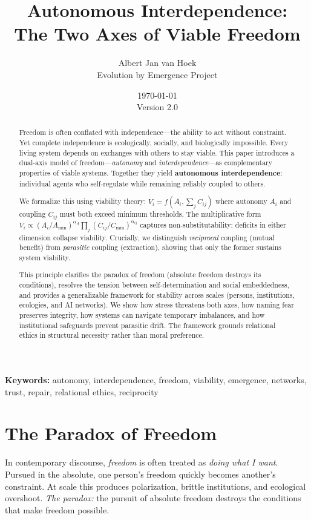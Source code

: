 \documentclass[11pt,a4paper]{article}
\title{\textbf{Autonomous Interdependence:\\The Two Axes of Viable Freedom}}
\author{Albert Jan van Hoek \\ \small Evolution by Emergence Project}
\date{\today \\ \small Version 2.0}
\begin{document}
\maketitle

\begin{abstract}
Freedom is often conflated with independence---the ability to act without constraint.
Yet complete independence is ecologically, socially, and biologically impossible.
Every living system depends on exchanges with others to stay viable.
This paper introduces a dual-axis model of freedom---\emph{autonomy} and \emph{interdependence}---as complementary properties of viable systems.
Together they yield \textbf{autonomous interdependence}: individual agents who self-regulate while remaining reliably coupled to others.

We formalize this using viability theory: $V_i = f(A_i, \sum_j C_{ij})$ where autonomy $A_i$ and coupling $C_{ij}$ must both exceed minimum thresholds. The multiplicative form $V_i \propto (A_i/A_{\min})^{\alpha_A} \prod_j (C_{ij}/C_{\min})^{\alpha_{ij}}$ captures non-substitutability: deficits in either dimension collapse viability. Crucially, we distinguish \emph{reciprocal} coupling (mutual benefit) from \emph{parasitic} coupling (extraction), showing that only the former sustains system viability.

This principle clarifies the paradox of freedom (absolute freedom destroys its conditions), resolves the tension between self-determination and social embeddedness, and provides a generalizable framework for stability across scales (persons, institutions, ecologies, and AI networks). We show how stress threatens both axes, how naming fear preserves integrity, how systems can navigate temporary imbalances, and how institutional safeguards prevent parasitic drift. The framework grounds relational ethics in structural necessity rather than moral preference.
\end{abstract}

\noindent\textbf{Keywords:} autonomy, interdependence, freedom, viability, emergence, networks, trust, repair, relational ethics, reciprocity

\section{The Paradox of Freedom}

In contemporary discourse, \emph{freedom} is often treated as \emph{doing what I want}.
Pursued in the absolute, one person's freedom quickly becomes another's constraint.
At scale this produces polarization, brittle institutions, and ecological overshoot.
\emph{The paradox:} the pursuit of absolute freedom destroys the conditions that make freedom possible.
\end{document}
